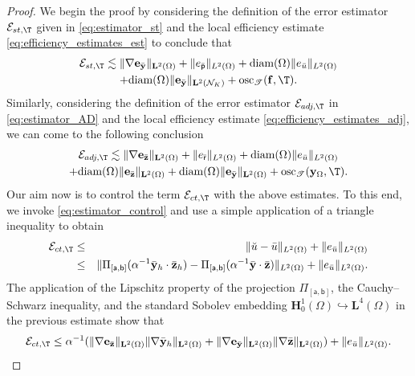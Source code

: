 \documentclass[final]{siamart0216}
\begin{document}
\begin{proof}
We begin the proof by considering the definition of the error estimator $\mathcal{E}_{st,\T}$ given in \eqref{eq:estimator_st} and the local efficiency estimate \eqref{eq:efficiency_estimates_est} to conclude that
\begin{multline}\label{eq:efficiency_estimates_est_global}
\mathcal{E}_{st,\T} \lesssim\|\nabla \mathbf{e}_{\bar{\mathbf{y}}} \|_{\mathbf{L}^2(\Omega)}+\| e_{\bar{\mathsf{p}}} \|_{L^2(\Omega)}
+
\text{diam}(\Omega) \|e_{\bar{u}}\|_{L^2(\Omega)}
\\
+\text{diam}(\Omega)\|\mathbf{e}_{\bar{\mathbf{y}}}\|_{\mathbf{L}^2(\mathcal{N}_{K})}+\text{osc}_{\mathscr{T}}(\mathbf{f},\T).
\end{multline}
Similarly, considering the definition of the error estimator $\mathcal{E}_{adj,\T}$ in \eqref{eq:estimator_AD} and the local efficiency estimate \eqref{eq:efficiency_estimates_adj}, we can come to the following conclusion
\begin{multline}\label{eq:efficiency_estimates_adj_global}
\mathcal{E}_{adj,\T} \lesssim\|\nabla \mathbf{e}_{\bar{\mathbf{z}}} \|_{\mathbf{L}^2(\Omega)}
+
\| e_{\bar{\mathsf{r}}} \|_{L^2(\Omega)}
+
\text{diam}(\Omega) \|e_{\bar{u}}\|_{L^2(\Omega)}\\
+
\text{diam}(\Omega)\|\mathbf{e}_{\bar{\mathbf{z}}}\|_{\mathbf{L}^2(\Omega)}+\text{diam}(\Omega)\|\mathbf{e}_{\bar{\mathbf{y}}}\|_{\mathbf{L}^2(\Omega)}+\text{osc}_{\mathscr{T}}(\mathbf{y}_{\Omega},\T).
\end{multline}
Our aim now is to control the term $\mathcal{E}_{ct,\T}$ with the above estimates. To this end, we invoke \eqref{eq:estimator_control} and use a simple application of a triangle inequality to obtain
\begin{eqnarray*}
\mathcal{E}_{ct,\T}	&\leq &\|\breve{u}-\bar{u}\|_{L^2(\Omega)}+\|e_{\bar{u}}\|_{L^2(\Omega)}
\\
&\leq &\|\Pi_{[\mathsf{a},\mathsf{b}]}(\alpha^{-1}\bar{\mathbf{y}}_{h}\cdot\bar{\mathbf{z}}_{h})-\Pi_{[\mathsf{a},\mathsf{b}]}(\alpha^{-1}\bar{\mathbf{y}}\cdot\bar{\mathbf{z}})\|_{L^2(\Omega)}+\|e_{\bar{u}}\|_{L^2(\Omega)}.
\end{eqnarray*}
The application of the Lipschitz property of the projection $\Pi_{[\mathsf{a},\mathsf{b}]}$, the Cauchy--Schwarz inequality, and the standard Sobolev embedding $\mathbf{H}_0^1(\Omega)\hookrightarrow\mathbf{L}^4(\Omega)$ in the previous estimate show that
\begin{align*}
\mathcal{E}_{ct,\T}\leq \alpha^{-1} (\|\nabla \mathbf{e}_{\bar{\mathbf{z}}}\|_{\mathbf{L}^2(\Omega)}\|\nabla \bar{\mathbf{y}}_{h}\|_{\mathbf{L}^2(\Omega)}+\|\nabla \mathbf{e}_{\bar{\mathbf{y}}}\|_{\mathbf{L}^2(\Omega)}\|\nabla \bar{\mathbf{z}}\|_{\mathbf{L}^2(\Omega)})+\|e_{\bar{u}}\|_{L^2(\Omega)}.

\end{align*}
\end{proof}
\end{document}
